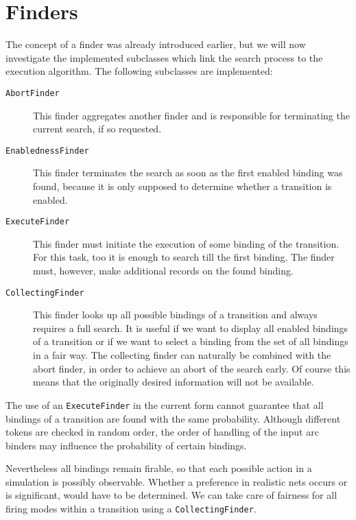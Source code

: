 \section{Finders}

The concept of a finder was already introduced earlier, but we will
now investigate the implemented subclasses which link the
search process to the execution algorithm. The following subclasses
are implemented:
\begin{description}
\item[\texttt{AbortFinder}] This finder aggregates another finder
  and is responsible for terminating the current search,
  if so requested.
\item[\texttt{EnablednessFinder}] This finder terminates the 
  search as soon as the first enabled binding was found, because it is 
  only supposed to determine whether a transition is enabled. 
\item[\texttt{ExecuteFinder}] This finder must initiate the execution of 
  some binding of the transition. For this task, too it is enough to 
  search till the first binding. The finder must, however, make additional 
  records on the found binding. 
\item[\texttt{CollectingFinder}] This finder looks up all possible 
  bindings of a transition and always requires a full search. 
  It is useful if we want to display all enabled bindings of 
  a transition or if we want to select a binding from the 
  set of all bindings in a fair way.  The collecting finder
  can naturally be combined with the abort finder, in order to
  achieve an abort of the search early. Of course this means that
  the originally desired information will not be available. 
\end{description}

The use of an \texttt{ExecuteFinder} in the current form cannot 
guarantee that all bindings of a transition are found with the 
same probability. Although different tokens are checked in random 
order, the order of handling of the input arc binders
may influence the probability of certain bindings.


Nevertheless all bindings remain firable, so that each possible 
action in a simulation is possibly observable. Whether a 
preference in realistic nets occurs or is significant, would 
have to be determined. We can take care of fairness for all 
firing modes within a transition using a \texttt{CollectingFinder}. 


